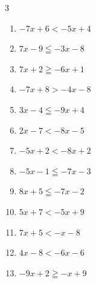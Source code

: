 \begin{multicols}{3}
\begin{enumerate}

  \item $-7x+6<-5x+4$

        \phantom{$\displaystyle x>1$}

  \item $7x-9\leqq -3x-8$


  \item $7x+2\geqq -6x+1$


  \item $-7x+8>-4x-8$


  \item $3x-4\leqq -9x+4$


  \item $2x-7<-8x-5$


\columnbreak %

  \item $-5x+2<-8x+2$

        \phantom{$\displaystyle x<0$}

  \item $-5x-1\leqq -7x-3$

        \phantom{$\displaystyle x\leqq -1$}

  \item $8x+5\leqq -7x-2$


  \item $5x+7<-5x+9$


  \item $7x+5<-x-8$


  \item $4x-8<-6x-6$


  \item $-9x+2\geqq -x+9$



\end{enumerate}
\end{multicols}
